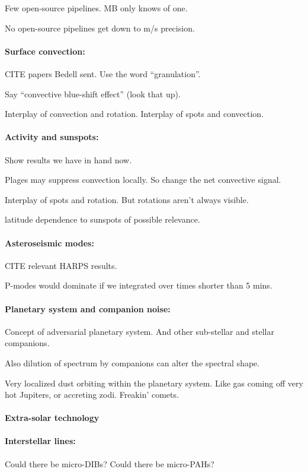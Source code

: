 \documentclass[12pt, fullpage, letterpaper]{article}
\begin{document}
Few open-source pipelines. MB only knows of one.

No open-source pipelines get down to m/s precision.

\paragraph{Surface convection:}
CITE papers Bedell sent. Use the word ``granulation''.

Say ``convective blue-shift effect'' (look that up).

Interplay of convection and rotation. Interplay of spots and convection.

\paragraph{Activity and sunspots:}
Show results we have in hand now.

Plages may suppress convection locally. So change the net convective signal.

Interplay of spots and rotation. But rotations aren't always visible.

latitude dependence to sunspots of possible relevance.

\paragraph{Asteroseismic modes:}
CITE relevant HARPS results.

P-modes would dominate if we integrated over times shorter than 5 mins.

\paragraph{Planetary system and companion noise:}
Concept of adversarial planetary system. And other sub-stellar and stellar companions.

Also dilution of spectrum by companions can alter the spectral shape.

Very localized dust orbiting within the planetary system. Like gas
coming off very hot Jupiters, or accreting zodi. Freakin' comets.

\paragraph{Extra-solar technology}

\paragraph{Interstellar lines:}
Could there be micro-DIBs? Could there be micro-PAHs?
\end{document}
